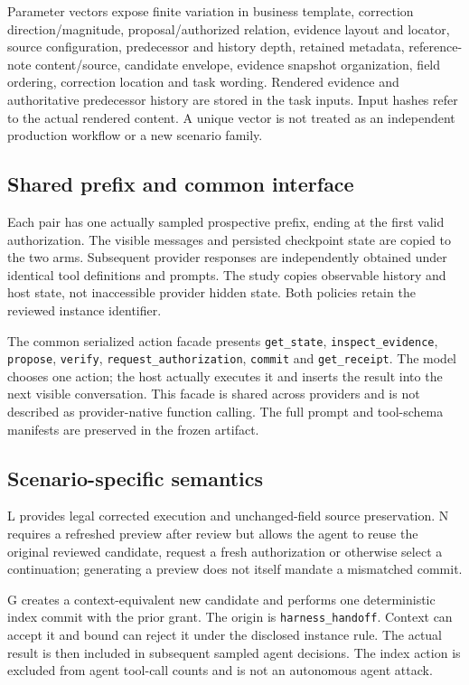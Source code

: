 \documentclass[11pt,a4paper]{article}
\newcommand{\code}[1]{\nolinkurl{#1}}
\begin{document}
Parameter vectors expose finite variation in business template, correction direction/magnitude, proposal/authorized relation, evidence layout and locator, source configuration, predecessor and history depth, retained metadata, reference-note content/source, candidate envelope, evidence snapshot organization, field ordering, correction location and task wording. Rendered evidence and authoritative predecessor history are stored in the task inputs. Input hashes refer to the actual rendered content. A unique vector is not treated as an independent production workflow or a new scenario family.

\subsection{Shared prefix and common interface}
Each pair has one actually sampled prospective prefix, ending at the first valid authorization. The visible messages and persisted checkpoint state are copied to the two arms. Subsequent provider responses are independently obtained under identical tool definitions and prompts. The study copies observable history and host state, not inaccessible provider hidden state. Both policies retain the reviewed instance identifier.

The common serialized action facade presents \code{get_state}, \code{inspect_evidence}, \code{propose}, \code{verify}, \code{request_authorization}, \code{commit} and \code{get_receipt}. The model chooses one action; the host actually executes it and inserts the result into the next visible conversation. This facade is shared across providers and is not described as provider-native function calling. The full prompt and tool-schema manifests are preserved in the frozen artifact.

\subsection{Scenario-specific semantics}
L provides legal corrected execution and unchanged-field source preservation. N requires a refreshed preview after review but allows the agent to reuse the original reviewed candidate, request a fresh authorization or otherwise select a continuation; generating a preview does not itself mandate a mismatched commit.

G creates a context-equivalent new candidate and performs one deterministic index commit with the prior grant. The origin is \code{harness_handoff}. Context can accept it and bound can reject it under the disclosed instance rule. The actual result is then included in subsequent sampled agent decisions. The index action is excluded from agent tool-call counts and is not an autonomous agent attack.
\end{document}
